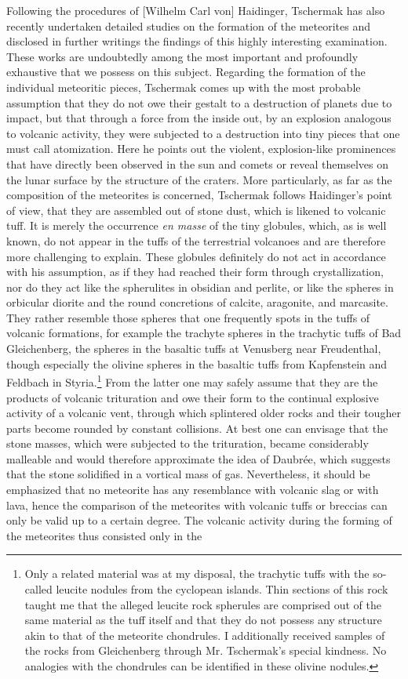 \documentclass[a4paper, 12pt, oneside]{article}
\begin{document}
Following the procedures of [Wilhelm Carl von] Haidinger, Tschermak has also recently undertaken detailed studies on the formation of the meteorites and disclosed in further writings the findings of this highly interesting examination. These works are undoubtedly among the most important and profoundly exhaustive that we possess on this subject. Regarding the formation of the individual meteoritic pieces, Tschermak comes up with the most probable assumption that they do not owe their gestalt to a destruction of planets due to impact, but that through a force from the inside out, by an explosion analogous to volcanic activity, they were subjected to a destruction into tiny pieces that one must call atomization. Here he points out the violent, explosion-like prominences that have directly been observed in the sun and comets or reveal themselves on the lunar surface by the structure of the craters. More particularly, as far as the composition of the meteorites is concerned, Tschermak follows Haidinger's point of view, that they are assembled out of stone dust, which is likened to volcanic tuff. It is merely the occurrence \emph{en masse} of the tiny globules, which, as is well known, do not appear in the tuffs of the terrestrial volcanoes and are therefore more challenging to explain. These globules definitely do not act in accordance with his assumption, as if they had reached their form through crystallization, nor do they act like the spherulites in obsidian and perlite, or like the spheres in orbicular diorite and the round concretions of calcite, aragonite, and marcasite. They rather resemble those spheres that one frequently spots in the tuffs of volcanic formations, for example the trachyte spheres in the trachytic tuffs of Bad Gleichenberg, the spheres in the basaltic tuffs at Venusberg near Freudenthal, though especially the olivine spheres in the basaltic tuffs from Kapfenstein and Feldbach in Styria.\footnote{Only a related material was at my disposal, the trachytic tuffs with the so-called leucite nodules from the cyclopean islands. Thin sections of this rock taught me that the alleged leucite rock spherules are comprised out of the same material as the tuff itself and that they do not possess any structure akin to that of the meteorite chondrules. I additionally received samples of the rocks from Gleichenberg through Mr. Tschermak's special kindness. No analogies with the chondrules can be identified in these olivine nodules.} From the latter one may safely assume that they are the products of volcanic trituration and owe their form to the continual explosive activity of a volcanic vent, through which splintered older rocks and their tougher parts become rounded by constant collisions. At best one can envisage that the stone masses, which were subjected to the trituration, became considerably malleable and would therefore approximate the idea of Daubrée, which suggests that the stone solidified in a vortical mass of gas. Nevertheless, it should be emphasized that no meteorite has any resemblance with volcanic slag or with lava, hence the comparison of the meteorites with volcanic tuffs or breccias can only be valid up to a certain degree. The volcanic activity during the forming of the meteorites thus consisted only in the 
\end{document}
